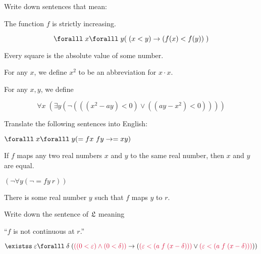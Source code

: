 \begin{problem}
  \step
  \begin{enumalph}
    \item Write down sentences that mean:
      \begin{enumroman}
        \item The function $f$ is strictly increasing.
        \begin{Answer}
          \[ \forall x \forall y (\; (x < y) \lto (f(x) < f(y))\;) \]
        \end{Answer}
        \item Every square is the absolute value of some number.
        \begin{Answer}
          \step
          For any $x$, we define $x^2$ to be an abbreviation for $x \cdot x$.

          \step
          For any $x, y$, we define 

          \[ \forall x \; ( \exists y (\lnot (((x^2 - ay) < 0) \lor ((ay - x^2) < 0)))) \]
        \end{Answer}
      \end{enumroman}
    \item Translate the following sentences into English:
      \begin{enumroman}
        \item $\forall x \forall y (= fx\ fy \lto = x y)$
          \begin{Answer}
            If $f$ maps any two real numbers $x$ and $y$
            to the same real number,
            then $x$ and $y$ are equal.
          \end{Answer}
        \item $(\lnot \forall y (\lnot = fy\ r))$
          \begin{Answer}
            There is some real number $y$ such that $f$ maps $y$ to $r$.
          \end{Answer}
      \end{enumroman}
    \item Write down the sentence of $\mathfrak{L}$ meaning
    \item ``$f$ is not continuous at $r$.''
      \begin{Answer}
        \[ \exists \eps \forall \delta \; ( \crim{((0 < \eps) \land (0 < \delta))} \lto (\crim{(\eps < (a\; f\; (x - \delta)))} \lor \crim{(\eps < (a\; f\; (x - \delta)))})) \]
      \end{Answer}
  \end{enumalph}
\end{problem}
